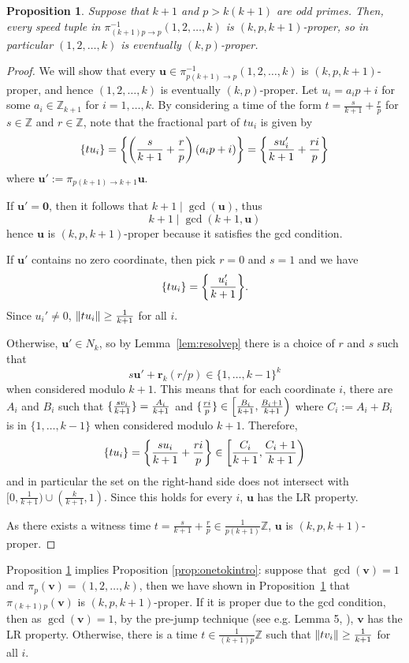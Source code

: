 \documentclass[11pt]{amsart}
\DeclarePairedDelimiter\norm{\lVert}{\rVert}
\DeclarePairedDelimiter\fracpart{\{}{\}}
\newcommand{\Z}{\mathbb{Z}}
\newcommand{\rbf}{\mathbf{r}}
\newcommand{\vbf}{\mathbf{v}}
\newcommand{\ubf}{\mathbf{u}}
\newcommand{\onetok}{(1, 2, \dots, k)}
\newtheorem{proposition}[theorem]{Proposition}
\theoremstyle{definition}
\theoremstyle{remark}
\begin{document}
\begin{proposition}
    \label{prop:corlarge}
    Suppose that $k+1$ and $p>k(k+1)$ are odd primes.
    Then, every speed tuple in $\pi_{(k+1)p\rightarrow p}^{-1}\onetok$ is $(k,p,k+1)$-proper, 
    so in particular $\onetok$ is eventually $(k,p)$-proper.
\end{proposition}
\begin{proof}
    We will show that every $\ubf \in \pi_{p(k+1) \to p}^{-1}\onetok$ is $(k,p,k+1)$-proper, 
    and hence $\onetok$ is eventually $(k,p)$-proper.
    Let $u_i = a_ip+i$ for some $a_i\in\Z_{k+1}$ for $i=1,\ldots,k$.
    By considering a time of the form $t=\frac{s}{k+1}+\frac{r}{p}$ for $s\in\Z$ and $r\in\Z$, 
    note that the fractional part of $tu_i$ is given by
    \[ \fracpart{tu_i}=\fracpart*{\left(\frac{s}{k+1}+\frac{r}{p}\right)(a_ip+i)}=\fracpart*{\frac{su'_i}{k+1}+\frac{ri}{p}} \] 
    where $\ubf' := \pi_{p(k+1)\to k+1} \ubf$. 
    
    If $\ubf'=\mathbf0$, then it follows that $k+1\mid\gcd(\ubf)$, thus \[k+1\mid\gcd(k+1,\ubf)\]
    hence $\ubf$ is $(k,p,k+1)$-proper because it satisfies the gcd condition.

    If $\ubf'$ contains no zero coordinate, then pick $r=0$ and $s=1$ and we have 
    \[ \fracpart{tu_i}=\fracpart*{\frac{u'_i}{k+1}}. \]
    Since $u_i' \ne 0$, $\norm{tu_i} \ge \frac{1}{k+1}$ for all $i$.

    Otherwise, $\ubf'\in N_k$, so by Lemma~\ref{lem:resolvep} there is a choice of $r$ and $s$ such that 
    \[ s\ubf' + \rbf_k(r/p) \in \{1,\ldots,k-1\}^k \]
    when considered modulo $k+1$. 
    This means that for each coordinate $i$, there are $A_i$ and $B_i$ such that 
    $\fracpart{\frac{sv_i}{k+1}}=\frac{A_i}{k+1}$ and 
    $\fracpart{\frac{ri}{p}}\in\left[\frac{B_i}{k+1},\frac{B_i+1}{k+1}\right)$ 
    where $C_i:=A_i+B_i$ is in $\{1,\ldots,k-1\}$ when considered modulo $k+1$. 
    Therefore,
    \[\fracpart{tu_i}=\fracpart*{\frac{su_i}{k+1}+\frac{ri}{p}}\in\left[\frac{C_i}{k+1},\frac{C_i+1}{k+1}\right)\]
    and in particular the set on the right-hand side does not intersect with $[0,\frac{1}{k+1}) \cup (\frac{k}{k+1},1)$.  
    Since this holds for every $i$, $\ubf$ has the LR property.

    As there exists a witness time $t=\frac{s}{k+1}+\frac{r}{p}\in\frac{1}{p(k+1)}\Z$, $\ubf$ is $(k,p,k+1)$-proper.
\end{proof}

Proposition \ref{prop:corlarge} implies Proposition \ref{prop:onetokintro}: 
suppose that $\gcd(\vbf)=1$ and $\pi_p(\vbf)=\onetok$, then we have shown in Proposition~\ref{prop:corlarge}
that $\pi_{(k+1)p}(\vbf)$ is $(k,p,k+1)$-proper. 
If it is proper due to the gcd condition, then as $\gcd(\vbf)=1$, by the pre-jump technique (see e.g. Lemma 5, \cite{Rosenfeld}), 
$\vbf$ has the LR property. 
Otherwise, there is a time $t\in\frac{1}{(k+1)p}\Z$ such that $\norm{tv_i}\geq\frac{1}{k+1}$ for all $i$.
\end{document}
